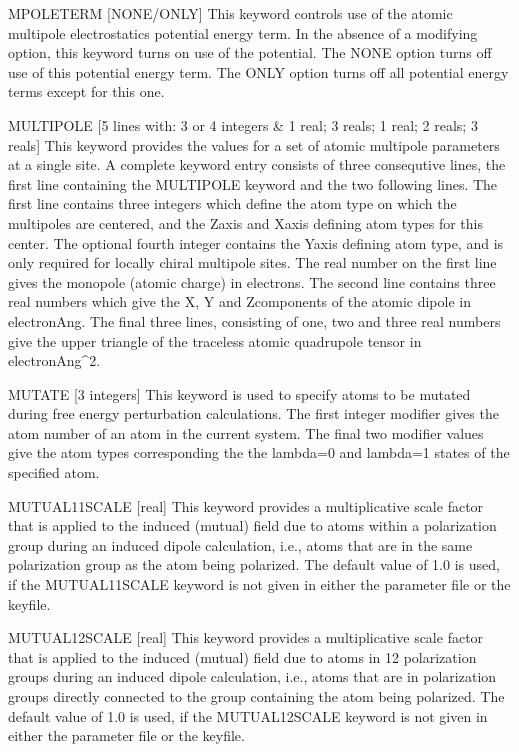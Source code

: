 \documentclass[letterpaper,11pt,english]{sphinxmanual}
\begin{document}
MPOLETERM {[}NONE/ONLY{]}     This keyword controls use of the atomic multipole electrostatics potential energy term. In the absence of a modifying option, this keyword turns on use of the potential. The NONE option turns off use of this potential energy term. The ONLY option turns off all potential energy terms except for this one.

MULTIPOLE {[}5 lines with: 3 or 4 integers \& 1 real; 3 reals; 1 real; 2 reals; 3 reals{]}     This keyword provides the values for a set of atomic multipole parameters at a single site. A complete keyword entry consists of three consequtive lines, the first line containing the MULTIPOLE keyword and the two following lines. The first line contains three integers which define the atom type on which the multipoles are centered, and the Z\sphinxhyphen{}axis and X\sphinxhyphen{}axis defining atom types for this center. The optional fourth integer contains the Y\sphinxhyphen{}axis defining atom type, and is only required for locally chiral multipole sites. The real number on the first line gives the monopole (atomic charge) in electrons. The second line contains three real numbers which give the X\sphinxhyphen{}, Y\sphinxhyphen{} and Z\sphinxhyphen{}components of the atomic dipole in electron\sphinxhyphen{}Ang. The final three lines, consisting of one, two and three real numbers give the upper triangle of the traceless atomic quadrupole tensor in electron\sphinxhyphen{}Ang\textasciicircum{}2.

MUTATE {[}3 integers{]}     This keyword is used to specify atoms to be mutated during free energy perturbation calculations. The first integer modifier gives the atom number of an atom in the current system. The final two modifier values give the atom types corresponding the the lambda=0 and lambda=1 states of the specified atom.

MUTUAL\sphinxhyphen{}11\sphinxhyphen{}SCALE {[}real{]}     This keyword provides a multiplicative scale factor that is applied to the induced (mutual) field due to atoms within a polarization group during an induced dipole calculation, i.e., atoms that are in the same polarization group as the atom being polarized. The default value of 1.0 is used, if the MUTUAL\sphinxhyphen{}11\sphinxhyphen{}SCALE keyword is not given in either the parameter file or the keyfile.

MUTUAL\sphinxhyphen{}12\sphinxhyphen{}SCALE {[}real{]}     This keyword provides a multiplicative scale factor that is applied to the induced (mutual) field due to atoms in 1\sphinxhyphen{}2 polarization groups during an induced dipole calculation, i.e., atoms that are in polarization groups directly connected to the group containing the atom being polarized. The default value of 1.0 is used, if the MUTUAL\sphinxhyphen{}12\sphinxhyphen{}SCALE keyword is not given in either the parameter file or the keyfile.
\end{document}
